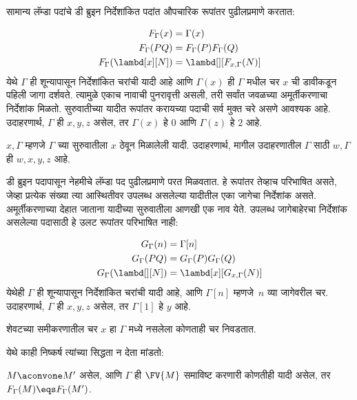 सामान्य लॅम्डा पदांचे डी ब्रुइन निर्देशांकित पदांत
औपचारिक रूपांतर पुढीलप्रमाणे करतात:
\begin{defn}
  \begin{align*}
    F_\Gamma(x) &= \Gamma(x) \\
    F_\Gamma(PQ) &= F_\Gamma(P)F_\Gamma(Q) \\
    F_\Gamma(\lambd[x][N]) &= \lambd[][F_{x,\Gamma}(N)]
  \end{align*}
  येथे $\Gamma$ ही शून्यापासून निर्देशांकित चरांची यादी
  आहे आणि $\Gamma(x)$ ही $\Gamma$ मधील चर $x$ ची
  डावीकडून पहिली जागा दर्शवते. त्यामुळे एकाच नावाची
  पुनरावृत्ती असली, तरी सर्वांत जवळच्या अमूर्तीकरणाचा
  निर्देशांक मिळतो. सुरुवातीच्या यादीत रूपांतर करायच्या
  पदाची सर्व मुक्त चरे असणे आवश्यक आहे. उदाहरणार्थ, $\Gamma$ ही $x,y,z$
  असेल, तर $\Gamma(x)$ हे $0$ आणि $\Gamma(z)$ हे $2$ आहे.

  $x,\Gamma$ म्हणजे $\Gamma$ च्या सुरुवातीला $x$
  ठेवून मिळालेली यादी. उदाहरणार्थ, मागील उदाहरणातील
  $\Gamma$ साठी $w,\Gamma$ ही $w,x,y,z$ आहे.
\end{defn}

डी ब्रुइन पदापासून नेहमीचे लॅम्डा पद पुढीलप्रमाणे
परत मिळवतात. हे रूपांतर तेव्हाच परिभाषित असते, जेव्हा
प्रत्येक संख्या त्या आस्थितीवर उपलब्ध असलेल्या यादीतील
एका जागेचा निर्देशांक असते. अमूर्तीकरणाच्या देहात
जाताना यादीच्या सुरुवातीला आणखी एक नाव येते.
उपलब्ध जागेबाहेरचा निर्देशांक असलेल्या पदासाठी
हे उलट रूपांतर परिभाषित नाही:

\begin{defn}
  \begin{align*}
    G_\Gamma(n) &= \Gamma[n] \\
    G_\Gamma(PQ) &= G_\Gamma(P) G_\Gamma(Q) \\
    G_\Gamma(\lambd[][N]) &= \lambd[x][G_{x,\Gamma}(N)]
  \end{align*}
  येथेही $\Gamma$ ही शून्यापासून निर्देशांकित चरांची
  यादी आहे, आणि $\Gamma[n]$ म्हणजे~$n$ व्या जागेवरील
  चर. उदाहरणार्थ, $\Gamma$ ही $x,y,z$ असेल, तर
  $\Gamma[1]$ हे $y$ आहे.

  शेवटच्या समीकरणातील चर $x$ हा $\Gamma$ मध्ये
  नसलेला कोणताही चर निवडतात.
\end{defn}

येथे काही निष्कर्ष त्यांच्या सिद्धता न देता मांडतो:

\begin{prop}
  $M \aconvone M'$ असेल, आणि $\Gamma$ ही
  $\FV{M}$ समाविष्ट करणारी कोणतीही यादी असेल,
  तर $F_\Gamma(M) \eqs F_\Gamma(M')$.
\end{prop}











